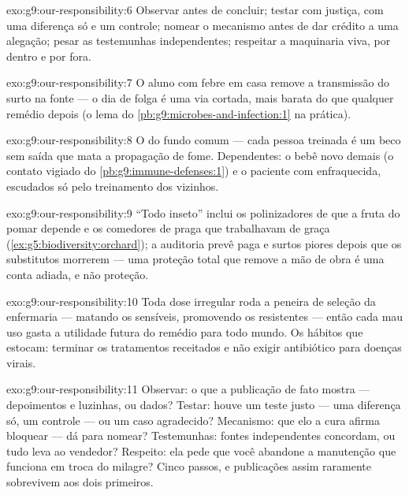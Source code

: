 \begin{solution}{exo:g9:our-responsibility:6}
Observar antes de concluir; testar com justiça, com uma
diferença só e um controle; nomear o mecanismo antes de dar
crédito a uma alegação; pesar as testemunhas independentes;
respeitar a maquinaria viva, por dentro e por fora.
\end{solution}

\begin{solution}{exo:g9:our-responsibility:7}
O aluno com febre em casa remove a transmissão do surto na
fonte --- o dia de folga é uma via cortada, mais barata do
que qualquer remédio depois (o lema do
\cref{pb:g9:microbes-and-infection:1} na prática).
\end{solution}

\begin{solution}{exo:g9:our-responsibility:8}
O do fundo comum --- cada pessoa treinada é um beco sem saída
que mata a propagação de fome. Dependentes: o bebê novo
demais (o contato vigiado do \cref{pb:g9:immune-defenses:1})
e o paciente com  enfraquecida, escudados só pelo
treinamento dos vizinhos.
\end{solution}

\begin{solution}{exo:g9:our-responsibility:9}
``Todo inseto'' inclui os polinizadores de que a fruta do
pomar depende e os comedores de praga que trabalhavam de
graça (\cref{ex:g5:biodiversity:orchard}); a auditoria prevê
 paga e surtos piores depois que os substitutos
morrerem --- uma proteção total que remove a mão de obra é
uma conta adiada, e não proteção.
\end{solution}

\begin{solution}{exo:g9:our-responsibility:10}
Toda dose irregular roda a peneira de seleção da enfermaria
--- matando os sensíveis, promovendo os resistentes --- então
cada mau uso gasta a utilidade futura do remédio para todo
mundo. Os hábitos que estocam: terminar os tratamentos
receitados e não exigir antibiótico para doenças virais.
\end{solution}

\begin{solution}{exo:g9:our-responsibility:11}
Observar: o que a publicação de fato mostra --- depoimentos e
luzinhas, ou dados? Testar: houve um teste justo --- uma
diferença só, um controle --- ou um caso agradecido?
Mecanismo: que elo a cura afirma bloquear --- dá para
nomear? Testemunhas: fontes independentes concordam, ou tudo
leva ao vendedor? Respeito: ela pede que você abandone a
manutenção que funciona em troca do milagre? Cinco passos, e
publicações assim raramente sobrevivem aos dois primeiros.
\end{solution}

